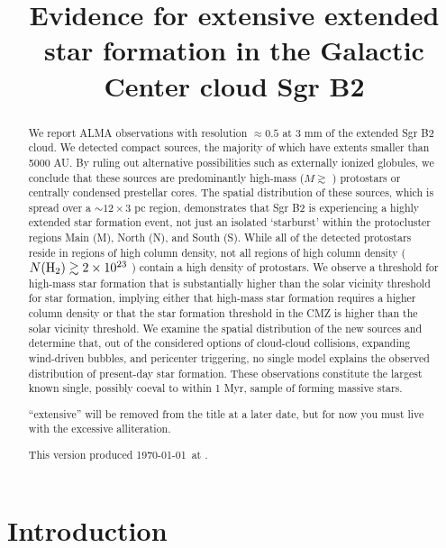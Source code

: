 \documentclass[twocolumn]{aastex61}
\begin{document}
\title{Evidence for extensive extended star formation in the Galactic Center
cloud Sgr B2}

\begin{abstract}
We report ALMA observations with resolution $\approx0.5$ \arcsec at 3 mm  of
the extended Sgr B2 cloud. We detected \ncores compact sources, the majority of
which have extents smaller than 5000 AU.  By ruling out alternative
possibilities such as externally ionized
globules, we conclude that these sources are predominantly high-mass
($M\gtrsim$ \msun) protostars or centrally condensed prestellar cores.  The
spatial distribution of these
sources, which is spread over a $\sim12\times3$ pc region, demonstrates that
Sgr B2 is experiencing a highly extended star
formation event, not just an isolated `starburst' within the protocluster
regions Main (M), North (N), and South (S).  While all of the detected
protostars reside in regions of high column density, not all regions of high
column density
($N(\textrm{H}_{2})\gtrsim2\times10^{23}$ \persc)
contain a high density of
protostars.  We observe a threshold for high-mass star formation that is
substantially higher than the solar vicinity threshold for star formation, implying
either that high-mass star formation requires a higher column density or that
the star formation threshold in the CMZ is higher than the solar vicinity
threshold.
We examine the spatial distribution of the new sources and determine that, out
of the considered options of cloud-cloud collisions, expanding wind-driven
bubbles, and pericenter triggering, no single model explains the observed
distribution of present-day star formation.
These observations constitute the largest known single, possibly
coeval to within 1 Myr, sample of forming massive stars.

{\color{red}``extensive'' will be removed from the title at a later date,
but for now you must live with the excessive alliteration.}

This version produced \today\ at \currenttime.
\end{abstract}




\section{Introduction}
\end{document}
